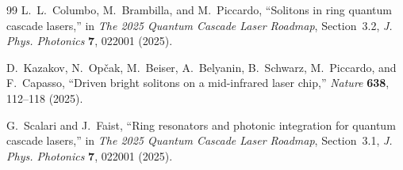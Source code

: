 \documentclass[11pt,letterpaper]{article}
\begin{document}
\begin{thebibliography}{99}
L.~L.~Columbo, M.~Brambilla, and M.~Piccardo, ``Solitons in ring quantum cascade lasers,'' in \textit{The 2025 Quantum Cascade Laser Roadmap}, Section~3.2, \textit{J. Phys. Photonics} \textbf{7}, 022001 (2025).

D.~Kazakov, N.~Op\v{c}ak, M.~Beiser, A.~Belyanin, B.~Schwarz, M.~Piccardo, and F.~Capasso, ``Driven bright solitons on a mid-infrared laser chip,'' \textit{Nature} \textbf{638}, 112--118 (2025).

G.~Scalari and J.~Faist, ``Ring resonators and photonic integration for quantum cascade lasers,'' in \textit{The 2025 Quantum Cascade Laser Roadmap}, Section~3.1, \textit{J. Phys. Photonics} \textbf{7}, 022001 (2025).

\end{thebibliography}
\end{document}
